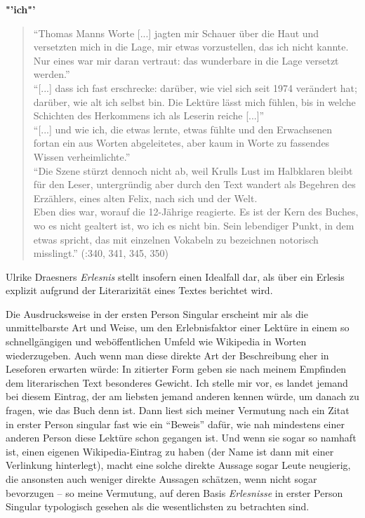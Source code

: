 \documentclass[fontsize=12pt]{scrartcl}
\begin{document}
\textbf{"'ich"'}

\singlespacing
\begin{quote}
"`Thomas Manns Worte [...] jagten mir Schauer \"uber die Haut und versetzten mich in die Lage, mir etwas vorzustellen, das ich nicht kannte. Nur eines war mir daran vertraut: das wunderbare \flq in die Lage versetzt werden\frq."'\\
"`[...] dass ich fast erschrecke: dar\"uber, wie viel sich seit 1974 ver\"andert hat; dar\"uber, wie alt ich \mbox{selbst} bin. Die Lekt\"ure l\"asst mich f\"uhlen, bis in welche Schichten des Herkommens ich als Leserin reiche [...]"'\\
"`[...] und wie ich, die etwas lernte, etwas f\"uhlte und den Erwachsenen fort\-an ein aus Worten abgeleitetes, aber kaum in Worte zu fassendes Wissen verheimlichte."'\\
"`Die Szene st\"urzt dennoch nicht ab, weil Krulls Lust im Halbklaren bleibt f\"ur den Leser, untergr\"undig aber durch den Text wandert als Begehren des Erz\"ahlers, eines alten Felix, nach sich und der Welt. \\ Eben dies war, worauf die 12-J\"ahrige reagierte. Es ist der Kern des Bu\-ches, wo es nicht gealtert ist, wo ich es nicht bin. Sein lebendiger Punkt, in dem etwas spricht, das mit einzelnen Vokabeln zu be\-zeichnen notorisch misslingt."' (\cite{Draesner2013}:340, 341, 345, 350)
\end{quote}
\onehalfspacing





Ulrike Draesners \textit{Erlesnis} stellt insofern einen Idealfall dar, als \"uber ein Erlesis explizit aufgrund der Literarizit\"at eines Textes berichtet wird.

Die Ausdrucksweise in der ersten Person Singular erscheint mir als die unmittelbarste Art und Weise, um den Erlebnisfaktor einer Lekt\"ure in einem so schnellg\"angigen und web\"of\-fent\-lichen Umfeld wie Wi\-ki\-pe\-dia in Worten wiederzugeben. Auch wenn man diese direkte Art der Beschreibung eher in Leseforen erwarten w\"urde: In zitierter Form geben sie nach meinem Empfinden dem li\-te\-ra\-rischen Text besonderes Gewicht. Ich stelle mir vor, es landet jemand bei diesem Eintrag, der am liebsten jemand anderen kennen w\"urde, um danach zu fragen, wie das Buch denn ist. Dann liest sich meiner Vermutung nach ein Zitat in erster Person singular fast wie ein "`Beweis"' daf\"ur, wie nah mindestens einer anderen Person diese Lekt\"ure schon gegangen ist. Und wenn sie sogar so namhaft ist, einen eigenen Wi\-ki\-pe\-dia-Eintrag zu haben (der Name ist dann mit einer Verlinkung hinterlegt), macht eine solche direkte Aussage sogar Leute neugierig, die ansonsten auch weniger direkte Aussagen sch\"atzen, wenn nicht sogar bevorzugen -- so meine Vermutung, auf deren Basis \textit{Erlesnisse} in erster Person Singular typologisch gesehen als die we\-sent\-lichsten zu betrachten sind.
\end{document}
